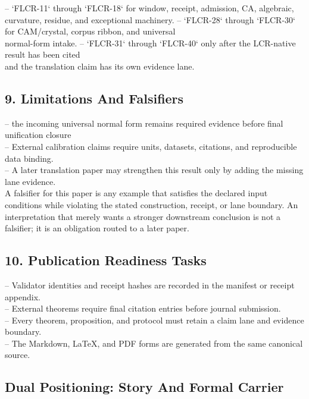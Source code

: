 \documentclass[11pt]{article}
\begin{document}
\noindent{}-- `FLCR-11` through `FLCR-18` for window, receipt, admission, CA, algebraic,\\
  curvature, residue, and exceptional machinery.
\noindent{}-- `FLCR-28` through `FLCR-30` for CAM/crystal, corpus ribbon, and universal\\
  normal-form intake.
\noindent{}-- `FLCR-31` through `FLCR-40` only after the LCR-native result has been cited\\
  and the translation claim has its own evidence lane.

\subsection*{9. Limitations And Falsifiers}

\noindent{}-- the incoming universal normal form remains required evidence before final unification closure\\
\noindent{}-- External calibration claims require units, datasets, citations, and reproducible data binding.\\
\noindent{}-- A later translation paper may strengthen this result only by adding the missing lane evidence.\\

A falsifier for this paper is any example that satisfies the declared input
conditions while violating the stated construction, receipt, or lane boundary.
An interpretation that merely wants a stronger downstream conclusion is not a
falsifier; it is an obligation routed to a later paper.

\subsection*{10. Publication Readiness Tasks}

\noindent{}-- Validator identities and receipt hashes are recorded in the manifest or receipt appendix.\\
\noindent{}-- External theorems require final citation entries before journal submission.\\
\noindent{}-- Every theorem, proposition, and protocol must retain a claim lane and evidence boundary.\\
\noindent{}-- The Markdown, LaTeX, and PDF forms are generated from the same canonical source.\\

\subsection*{Dual Positioning: Story And Formal Carrier}
\end{document}
